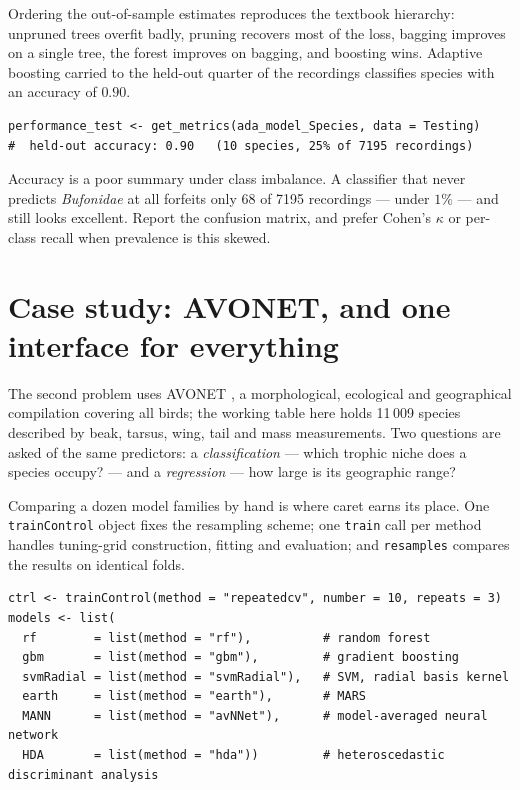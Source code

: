 \documentclass[11pt,oneside]{book}
\newcommand{\code}[1]{\texttt{#1}}
\newcommand{\pkg}[1]{\textsf{#1}}
\begin{document}
Ordering the out-of-sample estimates reproduces the textbook hierarchy: unpruned trees
overfit badly, pruning recovers most of the loss, bagging improves on a single tree, the
forest improves on bagging, and boosting wins. Adaptive boosting carried to the held-out
quarter of the recordings classifies species with an accuracy of $0.90$.

\begin{lstlisting}[style=rout]
performance_test <- get_metrics(ada_model_Species, data = Testing)
#  held-out accuracy: 0.90   (10 species, 25% of 7195 recordings)
\end{lstlisting}

\begin{pitfall}
Accuracy is a poor summary under class imbalance. A classifier that never predicts
\emph{Bufonidae} at all forfeits only 68 of 7195 recordings — under $1\%$ — and still
looks excellent. Report the confusion matrix, and prefer Cohen's $\kappa$ or per-class
recall when prevalence is this skewed.
\end{pitfall}

\section{Case study: AVONET, and one interface for everything}
The second problem uses AVONET \cite{Tobias_2022}, a morphological, ecological and
geographical compilation covering all birds; the working table here holds 11\,009 species
described by beak, tarsus, wing, tail and mass measurements. Two questions are asked of
the same predictors: a \emph{classification} — which trophic niche does a species occupy?
— and a \emph{regression} — how large is its geographic range?

Comparing a dozen model families by hand is where \pkg{caret} \cite{Kuhn_2008} earns its
place. One \code{trainControl} object fixes the resampling scheme; one \code{train} call
per method handles tuning-grid construction, fitting and evaluation; and \code{resamples}
compares the results on identical folds.

\begin{lstlisting}
ctrl <- trainControl(method = "repeatedcv", number = 10, repeats = 3)
models <- list(
  rf        = list(method = "rf"),          # random forest
  gbm       = list(method = "gbm"),         # gradient boosting
  svmRadial = list(method = "svmRadial"),   # SVM, radial basis kernel
  earth     = list(method = "earth"),       # MARS
  MANN      = list(method = "avNNet"),      # model-averaged neural network
  HDA       = list(method = "hda"))         # heteroscedastic discriminant analysis
\end{lstlisting}
\end{document}
